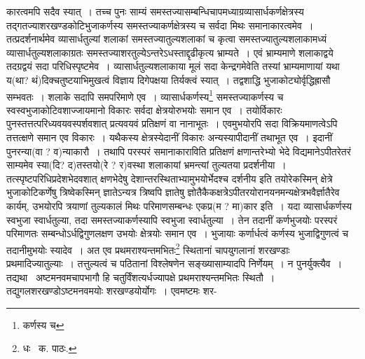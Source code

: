 \documentclass[11pt, openany]{book}
\begin{document}
\noindent कारत्वमपि सदैव स्यात्~। तच्च पुनः साम्यं समस्तज्यासम्बन्धिचापमध्याग्रव्यासार्धकर्णक्षेत्रस्य तद्गतज्याशरखण्डकोटिभुजाकर्णस्य
समस्तज्याकर्णक्षेत्रस्य च सर्वदा मिथः समानाकारत्वमेव~। तत्प्रदर्शनार्थमेव व्यासार्धतुल्यां शलाकां समस्तज्यातुल्यशलाकां च कृत्वा समस्तज्यातुल्यशलाकामध्यं व्यासार्धतुल्यशलाकाग्रतः समस्तज्याशरतुल्येऽन्तरेऽधस्ताद्दृढीकृत्य भ्राम्यते~। एवं भ्राम्यमाणे शलाकाद्वये तदग्रद्वयं सदा परिधिस्पृष्टमेव~। व्यासार्धतुल्यशलाकाया मूलं सदा केन्द्रगमेवेति तस्यां भ्राम्यमाणायां यथा य(था? थं)दिक्चतुष्टयाभिमुखत्वं विज्ञाय दिगेपक्षया तिर्यक्त्वं स्यात्~। तद्वशाद्धि भुजाकोट्योर्वृद्धिह्रासौ सम्भवतः~। शलाके सदापि समपरिमाणे एव~। व्यासार्धकर्णस्य\renewcommand{\thefootnote}{१}\footnote{कर्णस्य च} समस्तज्याकर्णस्य च स्वस्वभुजाकोटिवशाज्जायमानो विकारः सर्वदा क्षेत्रयोरुभयोः समान एव~। तयोर्विकारः पुनस्तत्तत्परिध्यवयवस्पर्शवशात् प्रत्यवयवं प्रतिक्षणं वा नानाभूतः~। एवमुभयोरपि सदा विक्रियमाणत्वेऽपि तत्तत्क्षणे समान एव विकारः~। यथैकस्य क्षेत्रस्येदानीं विकारः अन्यस्यापीदानीं तथाभूत एव~। इदानीं पुनरन्या(वा ? व)न्याकारौ~। तथापि परस्परं समानाकाराविति प्रतिक्षणं क्षणान्तरेभ्यो भेदे विद्यमानेऽपीतरेतरं
साम्यमेव स्या(दि? द)तस्तयो(रे ? र)वस्था शलाकायां भ्रमन्त्यां तुल्यतया प्रदर्शनीया~। तत्स्पृष्टपरिधिप्रदेशभेदवशात् क्षणभेदेषु
देशान्तरस्थिताभ्यामुभयोर्भेदश्च दर्शनीय इति तयोरेकस्मिन् क्षेत्रे भुजाकोटिकर्णेषु त्रिष्वेकस्मिन् ज्ञातेऽन्यत्र त्रिष्वपि ज्ञातेषु
ज्ञोतैकैकक्षत्रेऽपीतरयोरानयनमन्यक्षेत्रभवैर्ज्ञातैरेव कार्यम्, उभयोरपि त्रयाणां तुल्यकालं मिथः परिमाणसम्बन्धः एकप्र(म ? मा)कार इति~। यदा व्यासार्धकर्णस्य स्वभुजा स्वार्धतुल्या, तदा समस्तज्याकर्णस्यापि स्वभुजा स्वार्धतुल्या~। तेन तदानीं कर्णभुजयोः परस्परं परिमाणतः
सम्बन्धोऽर्धद्विगुणलक्षण उभयोः क्षेत्रयोः समान एव~। भुजायाः कर्णार्धत्वं कर्णस्य भुजाद्विगुणत्वं च तदानीमुभयोः स्यादेव~। अत एव प्रथमराश्यन्तमभितः\renewcommand{\thefootnote}{२}\footnote{धः \textendash\ क. पाठः.} स्थितानां चापयुगलानां शरखण्डाः प्रथमादिज्यातुल्याः~। तत्तुल्यत्वं च पठितानां विश्लेषणेन सङ्ख्यासाम्यादपि निर्णेयम्~। न पुनर्युक्त्यैव~। तद्यथा \textendash\ अष्टमनवमचापभागौ हि चतुर्विंशत्यर्धज्यापक्षे प्रथमराश्यन्तमभितः स्थितौ~। तद्युगलशरखण्डोऽष्टमनवमयोः शरखण्डयोर्योगः~। एवमष्टमः शर-

\newpage
\end{document}
